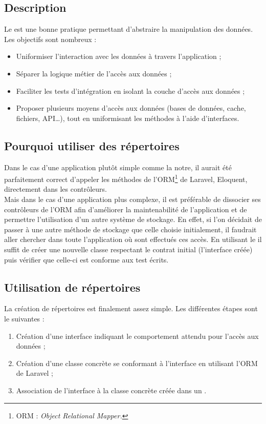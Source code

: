 	\subsection{Description}
		Le \repositoryPattern{} est une bonne pratique permettant d'abstraire la manipulation des données. Les objectifs sont nombreux :
		\begin{itemize}
			\item Uniformiser l’interaction avec les données à travers l'application ;
			\item Séparer la logique métier de l'accès aux données ;
			\item Faciliter les tests d'intégration en isolant la couche d'accès aux données ;
			\item Proposer plusieurs moyens d'accès aux données (bases de données, cache, fichiers, API\dots), tout en uniformisant les méthodes à l'aide d'interfaces.
		\end{itemize}

	\subsection{Pourquoi utiliser des répertoires}
		Dans le cas d'une application plutôt simple comme la notre, il aurait été parfaitement correct d'appeler les méthodes de l'ORM\footnote{ORM : \textit{Object Relational Mapper.}} de Laravel, Eloquent, directement dans les contrôleurs.\\

		Mais dans le cas d'une application plus complexe, il est préférable de dissocier ses contrôleurs de l'ORM afin d'améliorer la maintenabilité de l'application et de permettre l'utilisation d'un autre système de stockage. En effet, si l'on décidait de passer à une autre méthode de stockage que celle choisie initialement, il faudrait aller chercher dans toute l'application où sont effectués ces accès. En utilisant le \repositoryPattern{} il suffit de créer une nouvelle classe respectant le contrat initial (l'interface créée) puis vérifier que celle-ci est conforme aux test écrits.

	\subsection{Utilisation de répertoires}
		La création de répertoires est finalement assez simple. Les différentes étapes sont le suivantes :
		\begin{enumerate}
			\item Création d'une interface indiquant le comportement attendu pour l'accès aux données ;
			\item Création d'une classe concrète se conformant à l'interface en utilisant l'ORM de Laravel ;
			\item Association de l'interface à la classe concrète créée dans un \serviceProvider.
		\end{enumerate}

